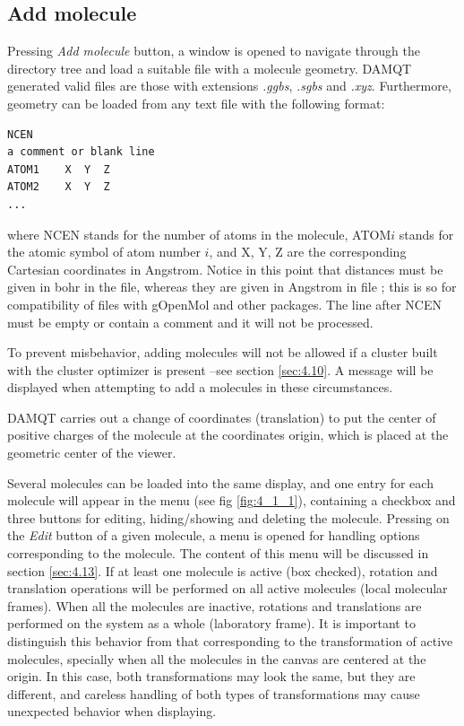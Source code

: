 \documentclass[10pt]{article}
\begin{document}
\subsection{Add molecule \label{sec:4.1}}

Pressing {\it Add molecule} button, a window is opened to navigate through the directory tree and load
a suitable file with a molecule geometry. DAMQT generated valid files are those with extensions {\it .ggbs}, {\it .sgbs} and {\it .xyz}. 
Furthermore, geometry can be loaded from any text file with 
the following format:

\begin{verbatim}
NCEN
a comment or blank line
ATOM1    X  Y  Z
ATOM2    X  Y  Z
...
\end{verbatim}
where NCEN stands for the number of atoms in the molecule, ATOM$i$ stands for
the atomic symbol of atom number $i$, and X, Y, Z are the corresponding
Cartesian coordinates in Angstrom. Notice in this point that distances must be
given in bohr in the \ggbs{ } file, whereas they are given
in Angstrom in file \xyz{ }; this is so for compatibility of \xyz{ } files
with
gOpenMol and other packages. The line after NCEN must be empty or contain a comment and it will not be processed.

To prevent misbehavior, adding molecules will not be allowed if a cluster
built with the cluster optimizer is present --see section \ref{sec:4.10}.
A message will be displayed when attempting to add a molecules in these
circumstances.

DAMQT carries out a change of coordinates (translation) 
to put the center of positive charges
of the molecule at the coordinates origin, which is placed at the geometric center of the viewer. 

Several molecules can be loaded into the same display, and one entry for each molecule will appear in the menu (see fig \ref{fig:4_1_1}), 
containing a checkbox and three buttons for editing, hiding/showing and deleting the molecule. Pressing on the {\it Edit} button of a given molecule,
a menu is opened for handling options corresponding to the molecule. The content of this menu will be discussed in section \ref{sec:4.13}. 
If at least one molecule is active (box checked),
rotation and translation operations will be performed on all active molecules (local molecular frames). 
When all the molecules are inactive, rotations and translations are performed on the system as a whole
(laboratory frame). It is important to distinguish this behavior from that corresponding to the transformation of
active molecules, specially when all the molecules in the canvas are centered at the origin. In this case,
both transformations may look the same, but they are different, and careless handling of both types of
transformations may cause unexpected behavior when displaying. 
\end{document}
